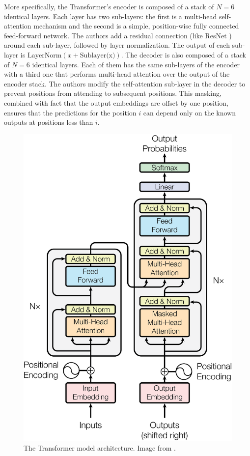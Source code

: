 More specifically, the Transformer's encoder  is composed of a stack of $N = 6$ identical layers. Each layer has two sub-layers: the first is a multi-head self-attention mechanism and the second is a simple, position-wise fully connected feed-forward network. The authors add a residual connection (like ResNet \cite{resnet}) around each sub-layer, followed by layer normalization. The output of each sub-layer is $\text{LayerNorm}(x + \text{Sublayer(x)})$. The decoder is also composed of a stack of $N = 6$ identical layers. Each of them has the same sub-layers of the encoder with a third one that performs multi-head attention over the output of the encoder stack. The authors modify the self-attention
sub-layer in the decoder to prevent positions from attending to subsequent positions. This masking, combined with fact that the output embeddings are offset by one position, ensures that the predictions for the position $i$ can depend only on the known outputs at positions less than $i$.

\begin{figure}[h!]
	\centering
	\includegraphics[width=0.8\linewidth]{images/transformerarchitecture.png}
	\caption{The Transformer model architecture. Image from \cite{transformer}.}
	\label{fig:transformerarc}
\end{figure}

